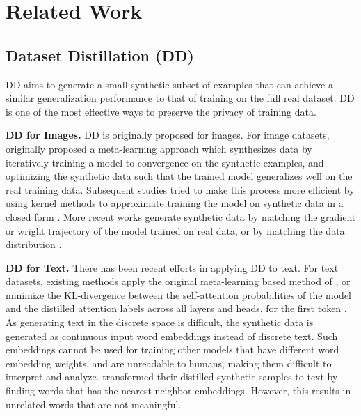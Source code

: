\section{Related Work}
\subsection{Dataset Distillation (DD)}
DD aims to generate a small synthetic subset of examples that can achieve a similar generalization performance to that of training on the full real dataset. DD is one of the most effective ways to preserve the privacy of training data.
%

\textbf{DD for Images.} DD is originally proposed for images. For image datasets, \citet{wang2018dataset} originally proposed a meta-learning approach which synthesizes data by iteratively training a model to convergence on the synthetic examples, and optimizing the synthetic data such that the trained model generalizes well on the real training data. 
Subsequent studies tried to make this process more efficient by using kernel methods %
to approximate training the model on synthetic data in a closed form \cite{loo2022efficient,nguyen2020dataset}. 
More recent works generate synthetic data by matching the gradient \cite{zhao2020dataset,zhao2021dataset,kim2022dataset} or wright trajectory \cite{cazenavette2022dataset,wang2022cafe} of the model trained on real data, or by matching the data distribution \cite{zhao2023dataset}.

\textbf{DD for Text. } 
There has been recent efforts in applying DD to text.
For text datasets, existing methods \cite{sucholutsky2021soft, li2021data,sahni2023exploring} apply the original meta-learning based method of \cite{wang2018dataset}, or minimize the KL-divergence between the self-attention probabilities of the model and the distilled attention labels across all layers and heads, for the first token \citet{maekawa2023dataset}. 
%
%
As generating text in the discrete space is difficult, the synthetic data is generated as continuous input word embeddings instead of discrete text.  
%
%
%
%
Such embeddings cannot be used for training other models that have different word embedding weights, and
%
%
%
are unreadable to humans, making them difficult to interpret and analyze. %
\citet{sucholutsky2021soft,sahni2023exploring} transformed their distilled synthetic samples to text by finding words that has the nearest neighbor embeddings. However, this results in unrelated words that are not meaningful.
%




